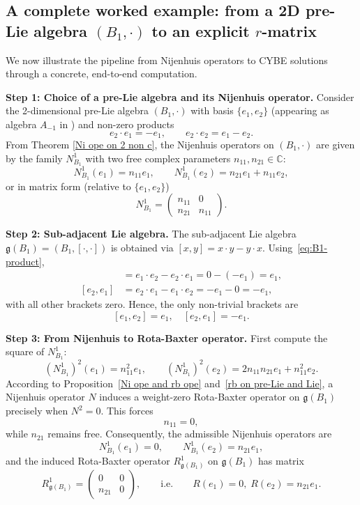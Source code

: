\documentclass[12pt, reqno]{amsart}
\theoremstyle{plain}
\begin{document}
\subsection{A complete worked example: from a 2D pre-Lie algebra $(B_1,\cdot)$ to an explicit $r$-matrix}
\label{subsec:example}
We now illustrate the pipeline from Nijenhuis operators to CYBE solutions through a concrete, end-to-end computation.

\textbf{Step 1: Choice of a pre-Lie algebra and its Nijenhuis operator.}
Consider the 2-dimensional pre-Lie algebra $(B_1,\cdot)$ with basis $\{e_1, e_2\}$ (appearing as algebra $A_{-1}$ in \cite{Bai-Meng}) and non-zero products  
\begin{equation}\label{eq:B1-product}  
e_2 \cdot e_1 = -e_1, \qquad e_2 \cdot e_2 = e_1 - e_2.  
\end{equation}  
From Theorem \ref{Ni ope on 2 non c}, the Nijenhuis operators on $(B_1,\cdot)$ are given by the family $N_{B_1}^1$ with two free complex parameters $n_{11}, n_{21} \in \mathbb{C}$:  
\begin{equation}\label{eq:Nij-B1}  
N_{B_1}^1(e_1) = n_{11} e_1, \qquad N_{B_1}^1(e_2) = n_{21} e_1 + n_{11} e_2,  
\end{equation}  
or in matrix form (relative to $\{e_1, e_2\}$)  
\[
N_{B_1}^1 = \begin{pmatrix} n_{11} & 0 \\ n_{21} & n_{11} \end{pmatrix}.
\]

\textbf{Step 2: Sub-adjacent Lie algebra.}
The sub-adjacent Lie algebra $\mathfrak{g}(B_1) = (B_1, [\cdot,\cdot])$ is obtained via $[x,y] = x\cdot y - y\cdot x$. Using~\eqref{eq:B1-product},  
\begin{align*}
[e_1, e_2] &= e_1\cdot e_2 - e_2\cdot e_1 = 0 - (-e_1) = e_1, \\
[e_2, e_1] &= e_2\cdot e_1 - e_1\cdot e_2 = -e_1 - 0 = -e_1,
\end{align*}  
with all other brackets zero. Hence, the only non-trivial brackets are  
$$
[e_1, e_2] = e_1, \quad [e_2, e_1] = -e_1.
$$

\textbf{Step 3: From Nijenhuis to Rota-Baxter operator.}
First compute the square of $N_{B_1}^1$:  
\[
(N_{B_1}^1)^2(e_1) = n_{11}^2 e_1, \qquad (N_{B_1}^1)^2(e_2) = 2n_{11}n_{21} e_1 + n_{11}^2 e_2.
\]  
According to Proposition~\ref{Ni ope and rb ope} and~\ref{rb on pre-Lie and Lie}, a Nijenhuis operator $N$ induces a weight-zero Rota-Baxter operator on $\mathfrak{g}(B_1)$ precisely when $N^2 = 0$. This forces  
\[
n_{11} = 0,
\]  
while $n_{21}$ remains free. Consequently, the admissible Nijenhuis operators are  
\[
N_{B_1}^1(e_1) = 0, \qquad N_{B_1}^1(e_2) = n_{21} e_1,
\]  
and the induced Rota-Baxter operator $R_{\mathfrak{g}(B_1)}^1$ on $\mathfrak{g}(B_1)$ has matrix  
\begin{equation}\label{eq:RB-param}
R_{\mathfrak{g}(B_1)}^1 = \begin{pmatrix} 0 & 0 \\ n_{21} & 0 \end{pmatrix}, \qquad \text{i.e.} \qquad R(e_1) = 0,\; R(e_2) = n_{21} e_1.
\end{equation}
\end{document}
